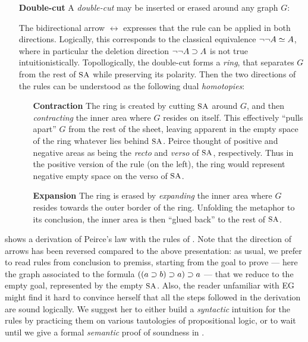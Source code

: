 \begin{itemize}
  \item[\textbf{Double-cut}]
    A \emph{double-cut} may be inserted or erased around any graph $G$:
    The bidirectional arrow $\leftrightarrow$ expresses that the rule can be
    applied in both directions.
    Logically, this corresponds to the classical equivalence $\neg\neg A
    \simeq A$, where in particular the deletion direction $\neg\neg A \supset A$
    is not true intuitionistically. Topollogically, the double-cut forms a
    \emph{ring}, that separates $G$ from the rest of $\small\textsc{SA}$ while preserving its
    polarity. Then the two directions of the rules can be understood as the
    following dual \emph{homotopies}:
    \begin{itemize}
      \item[\textbf{Contraction}] The ring is created by cutting $\small\textsc{SA}$ around
      $G$, and then \emph{contracting} the inner area where $G$ resides on
      itself. This effectively ``pulls apart'' $G$ from the rest of the sheet,
      leaving apparent in the empty space of the ring whatever lies behind
      $\small\textsc{SA}$. Peirce thought of positive and negative areas as being the
      \emph{recto} and \emph{verso} of $\small\textsc{SA}$, respectively. Thus in the positive
      version of the rule (on the left), the ring would represent negative empty
      space on the verso of $\small\textsc{SA}$.
      \item[\textbf{Expansion}] The ring is erased by \emph{expanding} the inner
      area where $G$ resides towards the outer border of the ring. Unfolding the
      metaphor to its conclusion, the inner area is then ``glued back'' to the
      rest of $\small\textsc{SA}$.
    \end{itemize}
\end{itemize}

 shows a derivation of Peirce's law with the rules of
. Note that the direction of arrows has been reversed compared to the
above presentation: as usual, we prefer to read rules from conclusion to
premiss, starting from the goal to prove --- here the graph associated to the
formula $((a \supset b) \supset a) \supset a$ --- that we reduce to the empty goal,
represented by the empty $\small\textsc{SA}$. Also, the reader unfamiliar with EG might find
it hard to convince herself that all the steps followed in the derivation are
sound logically. We suggest her to either build a \emph{syntactic} intuition for
the rules by practicing them on various tautologies of propositional logic, or
to wait until we give a formal \emph{semantic} proof of soundness in
.

